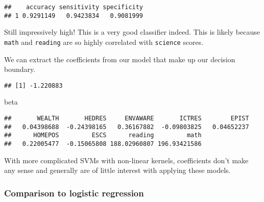 \documentclass[]{book}
\newenvironment{Shaded}{\begin{snugshade}}{\end{snugshade}}
\newcommand{\DecValTok}[1]{\textcolor[rgb]{0.00,0.00,0.81}{#1}}
\newcommand{\KeywordTok}[1]{\textcolor[rgb]{0.13,0.29,0.53}{\textbf{#1}}}
\newcommand{\NormalTok}[1]{#1}
\newcommand{\OperatorTok}[1]{\textcolor[rgb]{0.81,0.36,0.00}{\textbf{#1}}}
\newcommand{\StringTok}[1]{\textcolor[rgb]{0.31,0.60,0.02}{#1}}
\begin{document}
\begin{verbatim}
##    accuracy sensitivity specificity
## 1 0.9291149   0.9423834   0.9081999
\end{verbatim}

Still impressively high! This is a very good classifier indeed. This is likely because \texttt{math} and \texttt{reading} are so highly correlated with \texttt{science} scores.

We can extract the coefficients from our model that make up our decision boundary.

\begin{Shaded}
\end{Shaded}

\begin{verbatim}
## [1] -1.220883
\end{verbatim}

\begin{Shaded}
\begin{Highlighting}[]
\NormalTok{beta}
\end{Highlighting}
\end{Shaded}

\begin{verbatim}
##       WEALTH       HEDRES     ENVAWARE       ICTRES        EPIST 
##   0.04398688  -0.24398165   0.36167882  -0.09803825   0.04652237 
##      HOMEPOS         ESCS      reading         math 
##   0.22005477  -0.15065808 188.02960807 196.93421586
\end{verbatim}

With more complicated SVMs with non-linear kernels, coefficients don't make any sense and generally are of little interest with applying these models.

\hypertarget{comparison-to-logistic-regression}{%
\subsubsection{Comparison to logistic regression}\label{comparison-to-logistic-regression}}
\end{document}
